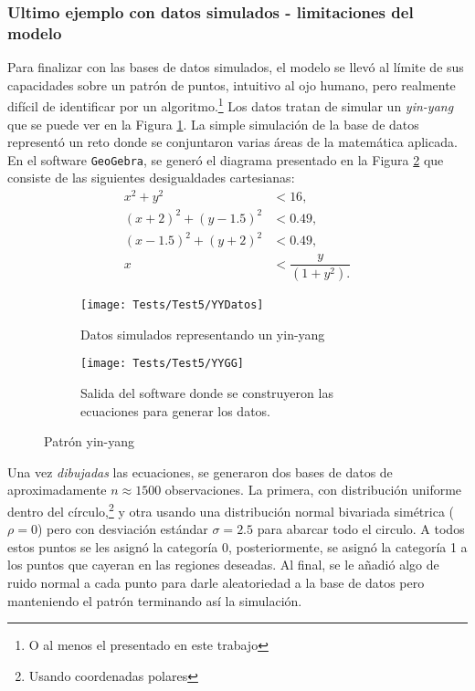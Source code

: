 \subsubsection*{Ultimo ejemplo con datos simulados - limitaciones del modelo}
Para finalizar con las  bases de datos simulados, el modelo se llevó al límite de sus capacidades sobre un patrón de puntos, intuitivo al ojo humano, pero realmente difícil de identificar por un algoritmo.\footnote{O al menos el presentado en este trabajo} Los datos tratan de simular un \textit{yin-yang} que se puede ver en la Figura \ref{fig:YYDatos}. La simple simulación de la base de datos representó un reto donde se conjuntaron varias áreas de la matemática aplicada. En el software \verb|GeoGebra|, se generó el diagrama presentado en la Figura \ref{fig:YYGG} que consiste de las siguientes desigualdades cartesianas:
\begin{align*}
	x^2 + y^2 &< 16, \\
	(x+2)^2 + (y-1.5)^2 &< 0.49, \\
	(x-1.5)^2 + (y+2)^2 &< 0.49, \\[4pt]
	x &< \dfrac{y}{(1+y^2).}
\end{align*}

\begin{figure}[h]
        \centering
        \begin{subfigure}[b]{0.45\textwidth}
            \centering
            \texttt{[image: Tests/Test5/YYDatos]}
            \caption{Datos simulados representando un yin-yang}   
            \label{fig:YYDatos}
        \end{subfigure}
        \hfill
        \begin{subfigure}[b]{0.45\textwidth}  
            \centering 
            \texttt{[image: Tests/Test5/YYGG]}
            \caption{Salida del software donde se construyeron las ecuaciones para generar los datos.}
            \label{fig:YYGG}
        \end{subfigure}
        \caption{Patrón yin-yang}
        \label{fig:YYInitialPlots}
\end{figure}
Una vez \textit{dibujadas} las ecuaciones, se generaron dos bases de datos de aproximadamente $n \approx 1500$ observaciones. La primera, con distribución uniforme dentro del círculo,\footnote{Usando coordenadas polares} y otra usando una distribución normal bivariada simétrica ($\rho = 0$) pero con desviación estándar $\sigma = 2.5$ para abarcar todo el circulo. A todos estos puntos se les asignó la categoría 0, posteriormente, se asignó la categoría 1 a los puntos que cayeran en las regiones deseadas. Al final, se le añadió algo de ruido normal a cada punto para darle aleatoriedad a la base de datos pero manteniendo el patrón terminando así la simulación.

